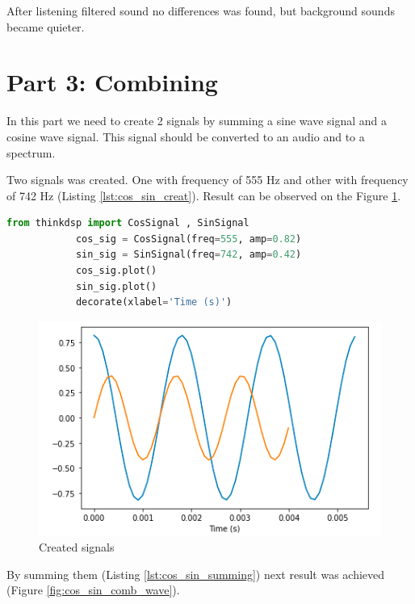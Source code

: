 \documentclass[a4paper]{article}
\begin{document}
        After listening filtered sound no differences was found, but background sounds became quieter.
        
    \newpage
        \section{Part 3: Combining}
            
        In this part we need to create 2 signals by summing a sine wave signal and a cosine wave signal. This signal should be converted to an audio and to a spectrum.
        
        Two signals was created. One with frequency of 555 Hz and other with frequency of 742 Hz (Listing \ref{lst:cos_sin_creat}). Result can be observed on the Figure \ref{fig:cos_sin_wave}.
            
        \begin{lstlisting}[language=Python,caption=Signal creation,label={lst:cos_sin_creat}]
            from thinkdsp import CosSignal , SinSignal
            cos_sig = CosSignal(freq=555, amp=0.82)
            sin_sig = SinSignal(freq=742, amp=0.42)
            cos_sig.plot()
            sin_sig.plot()
            decorate(xlabel='Time (s)')
        \end{lstlisting}
            
        \begin{figure}[H]
            \centering
            \includegraphics[width=\textwidth]{img/cos_sin.png}
            \caption{Created signals}
            \label{fig:cos_sin_wave}
        \end{figure}
            
        By summing them (Listing \ref{lst:cos_sin_summing}) next result was achieved (Figure \ref{fig:cos_sin_comb_wave}).
            
\end{document}
